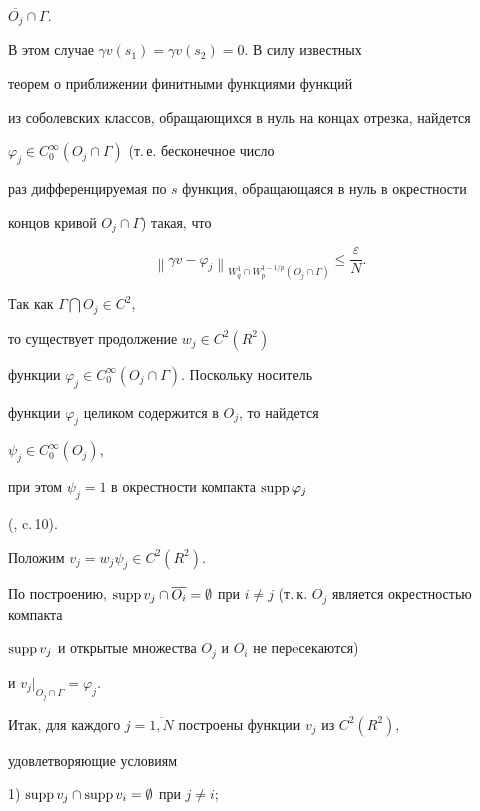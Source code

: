 $\overline{O_j} \cap \Gamma$.


В этом случае $\gamma v(s_1)=\gamma v(s_2)=0$. В силу известных


теорем о приближении финитными функциями функций


из соболевских классов, обращающихся в нуль на концах отрезка, найдется 


$\varphi _j \in C_0^\infty(O_j \cap \Gamma)$ (т.\,е. бесконечное число


раз дифференцируемая по $s$ функция, обращающаяся в нуль в окрестности


концов кривой $O_j \cap \Gamma$) такая, что


$$


{\left\| {\gamma v-\varphi _j}


\right\|}_{W_q^1\cap W_p^{1-1/p}(O_j\cap\Gamma)}


\le \frac{\varepsilon }{N}.


$$


Так как $\Gamma \bigcap O_j \in C^2$, 


то существует продолжение $w_j \in C^2(R^2)$


функции $\varphi _j \in C_0^\infty(O_j \cap \Gamma)$. Поскольку носитель


функции $\varphi_j$ целиком содержится в $O_j$, то найдется 


$\psi_j \in C_0^\infty(O_j)$, 


при этом $\psi_j=1$ в окрестности компакта $\operatorname{supp} \varphi _j$


(\cite{Her}, c.\,10).


Положим $v_j=w_j \psi_j \in C^2(R^2)$. 


По построению, $\supp v_j \cap \overline{O_i}


= \emptyset$ при $i \ne j$ (т.\,к. $O_j$ является окрестностью компакта


$\operatorname{supp} v_j$ и открытые множества $O_j$ и $O_i$ не перeсекаются)


и ${v_j|}_{O_j \cap \Gamma}=\varphi_j$.





Итак, для каждого $j=\overline{1,N}$ построены функции $v_j$ из $C^2(R^2)$,


удовлетворяющие условиям





1) $\operatorname{supp} v_j \cap \operatorname{supp} v_i = \emptyset$ при $j \ne i$;





